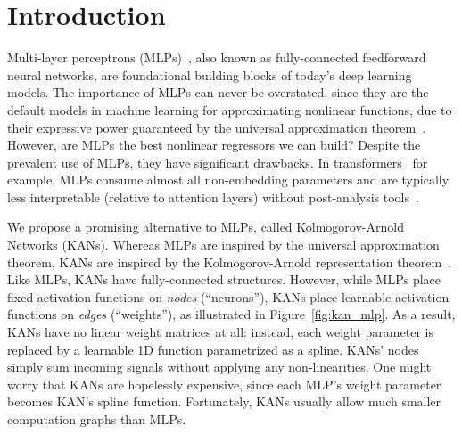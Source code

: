 \documentclass{article}
\numberwithin{equation}{section}
\numberwithin{figure}{section}
\begin{document}
\begin{abstract}

\end{abstract}

\section{Introduction}


Multi-layer perceptrons (MLPs)~\cite{haykin1994neural,cybenko1989approximation,hornik1989multilayer}, also known as fully-connected feedforward neural networks, are foundational building blocks of today's deep learning models. The importance of MLPs can never be overstated, since they are the default models in machine learning for approximating nonlinear functions, due to their expressive power guaranteed by the universal approximation theorem~\cite{hornik1989multilayer}. However, are MLPs the best nonlinear regressors we can build? Despite the prevalent use of MLPs, they have significant drawbacks. In transformers~\cite{vaswani2017attention} for example, MLPs consume almost all non-embedding parameters and are typically less interpretable (relative to attention layers) without post-analysis tools~\cite{cunningham2023sparse}.

We propose a promising alternative to MLPs, called Kolmogorov-Arnold Networks (KANs). Whereas MLPs are inspired by the universal approximation theorem, KANs are inspired by the Kolmogorov-Arnold representation theorem~\cite{kolmogorov, kolmogorov1957representation, braun2009constructive}. Like MLPs, KANs have fully-connected structures. However, while MLPs place fixed activation functions on \textit{nodes} (``neurons''), KANs place learnable activation functions on \textit{edges} (``weights''), as illustrated in Figure~\ref{fig:kan_mlp}. As a result, KANs have no linear weight matrices at all: instead, each weight parameter is replaced by a learnable 1D function parametrized as a spline. KANs' nodes simply sum incoming signals without applying any non-linearities. One might worry that KANs are hopelessly expensive, since each MLP's weight parameter becomes KAN's spline function. Fortunately, KANs usually allow much smaller computation graphs than MLPs. %
\end{document}
